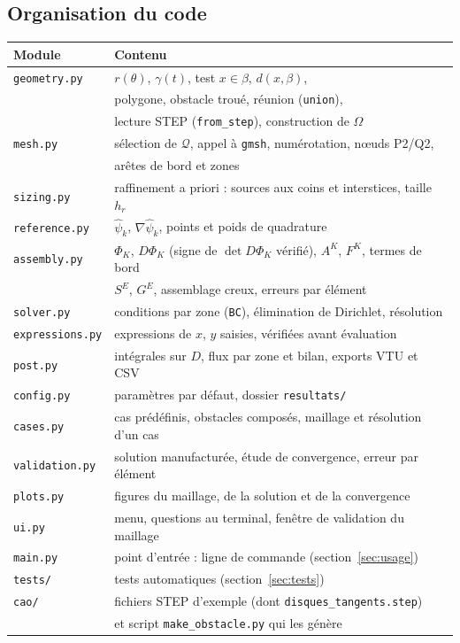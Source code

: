 \documentclass[11pt,a4paper]{article}
\begin{document}
\subsection{Organisation du code}

\begin{center}
\begin{tabular}{ll}
\hline
Module & Contenu \\
\hline
\texttt{geometry.py}  & $r(\theta)$, $\gamma(t)$, test $x \in \beta$, $d(x,\beta)$, \\
                      & polygone, obstacle troué, réunion (\texttt{union}), \\
                      & lecture STEP (\texttt{from\_step}), construction de $\Omega$ \\
\texttt{mesh.py}      & sélection de $\mathcal{Q}$, appel à \texttt{gmsh}, numérotation, nœuds P2/Q2, \\
                      & arêtes de bord et zones \\
\texttt{sizing.py}    & raffinement a priori : sources aux coins et interstices, taille $h_r$ \\
\texttt{reference.py} & $\widehat{\psi}_k$, $\nabla\widehat{\psi}_k$, points et poids de quadrature \\
\texttt{assembly.py}  & $\Phi_K$, $D\Phi_K$ (signe de $\det D\Phi_K$ vérifié), $A^K$, $F^K$, termes de bord \\
                      & $S^E$, $G^E$, assemblage creux, erreurs par élément \\
\texttt{solver.py}    & conditions par zone (\texttt{BC}), élimination de Dirichlet, résolution \\
\texttt{expressions.py} & expressions de $x$, $y$ saisies, vérifiées avant évaluation \\
\texttt{post.py}      & intégrales sur $D$, flux par zone et bilan, exports VTU et CSV \\
\texttt{config.py}    & paramètres par défaut, dossier \texttt{resultats/} \\
\texttt{cases.py}     & cas prédéfinis, obstacles composés, maillage et résolution d'un cas \\
\texttt{validation.py} & solution manufacturée, étude de convergence, erreur par élément \\
\texttt{plots.py}     & figures du maillage, de la solution et de la convergence \\
\texttt{ui.py}        & menu, questions au terminal, fenêtre de validation du maillage \\
\texttt{main.py}      & point d'entrée : ligne de commande (section~\ref{sec:usage}) \\
\texttt{tests/}       & tests automatiques (section~\ref{sec:tests}) \\
\texttt{cao/}         & fichiers STEP d'exemple (dont \texttt{disques\_tangents.step}) \\
                      & et script \texttt{make\_obstacle.py} qui les génère \\
\hline
\end{tabular}
\end{center}
\end{document}
